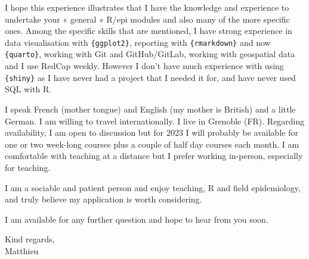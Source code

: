 \documentclass[
  letterpaper,
  DIV=11,
  numbers=noendperiod]{scrartcl}
\begin{document}
I hope this experience illustrates that I have the knowledge and
experience to undertake your « general » R/epi modules and also many of
the more specific ones. Among the specific skills that are mentioned, I
have strong experience in data visualisation with \texttt{\{ggplot2\}},
reporting with \texttt{\{rmarkdown\}} and now \texttt{\{quarto\}},
working with Git and GitHub/GitLab, working with geospatial data and I
use RedCap weekly. However I don't have much experience with using
\texttt{\{shiny\}} as I have never had a project that I needed it for,
and have never used SQL with R.

I speak French (mother tongue) and English (my mother is British) and a
little German. I am willing to travel internationally. I live in
Grenoble (FR). Regarding availability, I am open to discussion but for
2023 I will probably be available for one or two week-long courses plus
a couple of half day courses each month. I am comfortable with teaching
at a distance but I prefer working in-person, especially for teaching.

I am a sociable and patient person and enjoy teaching, R and field
epidemiology, and truly believe my application is worth considering.

I am available for any further question and hope to hear from you soon.

Kind regards,\\
Matthieu
\end{document}
